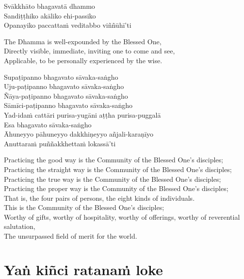 Svākkhāto bhagavatā dhammo\\
Sandiṭṭhiko akāliko ehi-passiko\\
Opanayiko paccattaṁ veditabbo viññūhī'ti

\begin{english-verses}
  The Dhamma is well-expounded by the Blessed One,\\
  Directly visible, immediate, inviting one to come and see,\\
  Applicable, to be personally experienced by the wise.
\end{english-verses}

Supaṭipanno bhagavato sāvaka-saṅgho\\
Uju-paṭipanno bhagavato sāvaka-saṅgho\\
Ñāya-paṭipanno bhagavato sāvaka-saṅgho\\
Sāmīci-paṭipanno bhagavato sāvaka-saṅgho\\
Yad-idaṁ cattāri purisa-yugāni aṭṭha purisa-puggalā\\
Esa bhagavato sāvaka-saṅgho\\
Āhuneyyo pāhuneyyo dakkhiṇeyyo añjali-karaṇīyo\\
Anuttaraṁ puññakkhettaṁ lokassā'ti

\begin{english-verses}
  Practicing the good way is the Community of the Blessed One's disciples;\\
  Practicing the straight way is the Community of the Blessed One's disciples;\\
  Practicing the true way is the Community of the Blessed One's disciples;\\
  Practicing the proper way is the Community of the Blessed One's disciples;\\
  That is, the four pairs of persons, the eight kinds of individuals.\\
  This is the Community of the Blessed One's disciples;\\
  Worthy of gifts, worthy of hospitality, worthy of offerings, worthy of reverential salutation,\\
  The unsurpassed field of merit for the world.
\end{english-verses}

\suttaRef{[SN 11.3]}

\section{Yaṅ kiñci ratanaṁ loke}
\label{yan-kinci-ratanam-loke}

